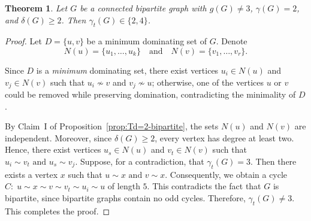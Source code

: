 \documentclass[12pt]{amsart}
\theoremstyle{plain}
\newtheorem{theorem}{Theorem}[section]
\theoremstyle{definition}
\begin{document}
\begin{theorem}
Let $G$ be a connected bipartite graph with $g(G)\neq 3$, $\gamma(G)=2$, and $\delta(G)\ge 2$. Then $\gamma_t(G)\in\{2,4\}$.
\end{theorem}

\begin{proof}
Let $D=\{u,v\}$ be a minimum dominating set of $G$. Denote
\[
N(u)=\{u_1,\dots,u_k\}
\quad \text{and} \quad
N(v)=\{v_1,\dots,v_r\}.
\]

Since $D$ is a \emph{minimum} dominating set, there exist vertices 
$u_i \in N(u)$ and $v_j \in N(v)$ such that $u_i \nsim v$ and 
$v_j \nsim u$; otherwise, one of the vertices $u$ or $v$ could be removed while preserving domination, contradicting the minimality of $D$.

By Claim~I of Proposition~\ref{prop:Td=2-bipartite}, the sets $N(u)$ and $N(v)$ are independent. Moreover, since $\delta(G)\ge 2$, every vertex has degree at least two. Hence, there exist vertices $u_s \in N(u)$ and $v_t \in N(v)$ such that
$u_i \sim v_t
\text{ and } 
u_s \sim v_j.$
Suppose, for a contradiction, that $\gamma_t(G)=3$. Then there exists a vertex $x$ such that 
$u \sim x 
 \text{ and }
v \sim x.$
Consequently, we obtain a cycle
$C:\; u \sim x \sim v \sim v_t \sim u_i \sim u$
of length $5$. 
This contradicts the fact that $G$ is bipartite, since bipartite graphs contain no odd cycles. Therefore, $\gamma_t(G)\neq 3$. This completes the proof.
\end{proof}
\end{document}
